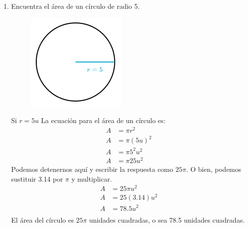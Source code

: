 \documentclass[11pt]{book}
\begin{document}
\begin{enumerate}
  \item Encuentra el área de un círculo de radio 5.

        \begin{minipage}{0.3\textwidth}
          \begin{figure}[H]
            \centering
            \includegraphics[width=\linewidth]{./Unidad 2/Images/figS10_001.png}
          \end{figure}
        \end{minipage}\hfill
        \begin{minipage}{0.65\textwidth}
          Si $r=5u$ La ecuación para el área de un círculo es:
          \begin{align*}
            A & = \pi r^2    \\
            A & = \pi (5u)^2 \\
            A & = \pi 5^2u^2 \\
            A & =  \pi 25u^2
          \end{align*}
          Podemos detenernos aquí y escribir la respuesta como $25\pi$. O bien, podemos sustituir 3.14 por $\pi$ y multiplicar.
          \begin{align*}
            A & = 25 \pi  u^2   \\
            A & = 25 (3.14) u^2 \\
            A & = 78.5  u^2     \\
          \end{align*}
          El área del círculo es $25\pi$ unidades cuadradas, o sea 78.5 unidades cuadradas.
        \end{minipage}


\end{enumerate}
\end{document}

